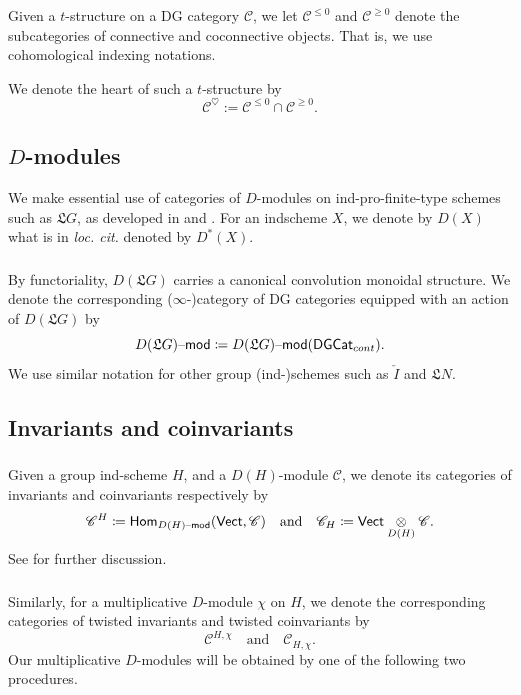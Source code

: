 \documentclass[11pt,reqno]{amsart}
\newcommand{\fL}{\mathfrak{L}}
\theoremstyle{remark}
\numberwithin{equation}{section}
\newcommand{\cC}{\mathscr{C}}
\newcommand{\Vect}{\mathsf{Vect}}
\renewcommand{\mod}{\text{\textendash}\mathsf{mod}}
\newcommand{\DGCat}{\mathsf{DGCat}}
\begin{document}
Given a $t$-structure on a DG category $\cC$, 
we let $\cC^{\leqslant 0}$ and  $\cC^{\geqslant 0}$ denote
the subcategories of connective and coconnective
objects. That is, we use cohomological indexing notations. 

We denote the heart of such a $t$-structure by 
\[\cC^\heartsuit := \cC^{\leqslant 0} \cap \cC^{\geqslant 0}.\] 


\subsection{$D$-modules} 

We make essential use of categories of $D$-modules on 
ind-pro-finite-type schemes such as $\fL G$, as developed in \cite{beraldo} 
and \cite{rdm}. For an indscheme $X$, we denote by $D(X)$ what is in {\em loc. 
	cit.} denoted by 
$D^*(X)$. 

\subsubsection{}
By functoriality, $D(\fL G)$ carries a canonical convolution 
monoidal structure. We denote the corresponding 
($\infty$-)category of DG categories 
equipped with an action of $D(\fL G)$ by 
%
\[
D(\fL G)\mod \coloneqq D(\fL G)\mod(\DGCat_{cont}).
\] 
%
\noindent We use similar notation for other group  
(ind-)schemes 
such as $\check{I}$ and $\fL N$. 


\subsection{Invariants and coinvariants} 

\subsubsection{}

Given a group ind-scheme $H$, and a $D(H)$-module 
$\cC$, we denote its categories of invariants and coinvariants 
respectively by 
%
\[  \cC^H \coloneqq
\mathsf{Hom}_{D(H)\mod}(\Vect,\cC)
 \quad  \text{and} \quad  
 \cC_H \coloneqq \Vect \underset{D(H)}{\otimes} \cC.
\]
%
See \cite{beraldo} for further discussion. 

\subsubsection{}

Similarly, for a multiplicative $D$-module $\chi$ on $H$, 
we denote the 
corresponding categories of twisted invariants and twisted coinvariants by 
%
\[ \cC^{H, \chi} \quad  \text{and} \quad  \cC_{H, \chi}.
\]
%
Our multiplicative $D$-modules will be obtained
by one of the following two procedures.
\end{document}
